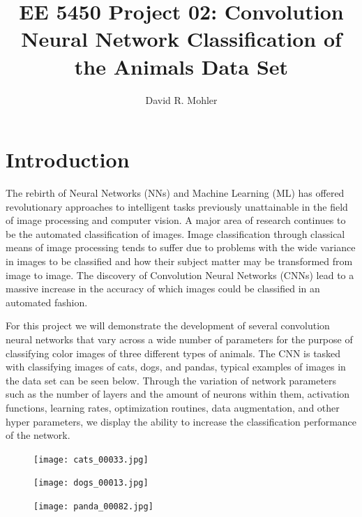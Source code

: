 \documentclass[12pt]{article}
\begin{document}
\title{EE 5450  Project 02: Convolution Neural Network Classification of the Animals Data Set}

\author{David R. Mohler}


\maketitle

\section{Introduction} 
The rebirth of Neural Networks (NNs) and Machine Learning (ML) has offered revolutionary approaches to intelligent tasks previously unattainable in the field of image processing and computer vision. A major area of research continues to be the automated classification of images. Image classification through classical means of image processing tends to suffer due to problems with the wide variance in images to be classified and how their subject matter may be transformed from image to image. The discovery of Convolution Neural Networks (CNNs) lead to a massive increase in the accuracy of which images could be classified in an automated fashion. 

For this project we will demonstrate the development of several convolution neural networks that vary across a wide number of parameters for the purpose of classifying color images of three different types of animals. The CNN is tasked with classifying images of cats, dogs, and pandas, typical examples of images in the data set can be seen below. Through the variation of network parameters such as the number of layers and the amount of neurons within them, activation functions, learning rates, optimization routines, data augmentation, and other hyper parameters, we display the ability to increase the classification performance of the network. 
\begin{figure}[h]
	\centering %
	\captionsetup{justification=centering}
	\begin{minipage}{0.33\textwidth}
		\centering %
		\texttt{[image: cats\_00033.jpg]}
	\end{minipage}\hfill
	\begin{minipage}{0.33\textwidth}
		\centering %
		\texttt{[image: dogs\_00013.jpg]}
	\end{minipage}\hfill
	\begin{minipage}{0.33\textwidth}
		\centering %
		\texttt{[image: panda\_00082.jpg]}
	\end{minipage}\hfill
\end{figure}
\end{document}
